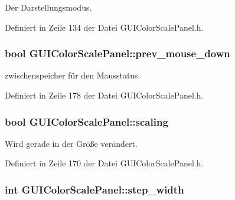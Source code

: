 Der Darstellungsmodus. 



Definiert in Zeile 134 der Datei G\-U\-I\-Color\-Scale\-Panel.\-h.

\hypertarget{classGUIColorScalePanel_ac7050aa7729236561154b0b9be894ed6}{
\subsubsection[{prev\-\_\-mouse\-\_\-down}]{\setlength{\rightskip}{0pt plus 5cm}bool G\-U\-I\-Color\-Scale\-Panel\-::prev\-\_\-mouse\-\_\-down\hspace{0.3cm}{\ttfamily [private]}}}\label{classGUIColorScalePanel_ac7050aa7729236561154b0b9be894ed6}


zwischenspeicher für den Mausstatus. 



Definiert in Zeile 178 der Datei G\-U\-I\-Color\-Scale\-Panel.\-h.

\hypertarget{classGUIColorScalePanel_aec005c07c64a17ffe6d362f4de0a04b1}{
\subsubsection[{scaling}]{\setlength{\rightskip}{0pt plus 5cm}bool G\-U\-I\-Color\-Scale\-Panel\-::scaling\hspace{0.3cm}{\ttfamily [private]}}}\label{classGUIColorScalePanel_aec005c07c64a17ffe6d362f4de0a04b1}


Wird gerade in der Größe verändert. 



Definiert in Zeile 170 der Datei G\-U\-I\-Color\-Scale\-Panel.\-h.

\hypertarget{classGUIColorScalePanel_a5f9789cc727854594c7d29c392578427}{
\subsubsection[{step\-\_\-width}]{\setlength{\rightskip}{0pt plus 5cm}int G\-U\-I\-Color\-Scale\-Panel\-::step\-\_\-width\hspace{0.3cm}{\ttfamily [private]}}}\label{classGUIColorScalePanel_a5f9789cc727854594c7d29c392578427}


